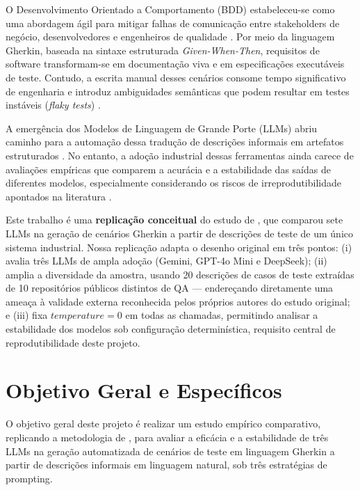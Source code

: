 \documentclass[12pt]{article}
\begin{document}
O Desenvolvimento Orientado a Comportamento (BDD) estabeleceu-se como uma abordagem ágil para mitigar falhas de comunicação entre stakeholders de negócio, desenvolvedores e engenheiros de qualidade \cite{solis2011,farooq2023}. Por meio da linguagem Gherkin, baseada na sintaxe estruturada \textit{Given-When-Then}, requisitos de software transformam-se em documentação viva e em especificações executáveis de teste. Contudo, a escrita manual desses cenários consome tempo significativo de engenharia e introduz ambiguidades semânticas que podem resultar em testes instáveis (\textit{flaky tests}) \cite{farooq2023}.

A emergência dos Modelos de Linguagem de Grande Porte (LLMs) abriu caminho para a automação dessa tradução de descrições informais em artefatos estruturados \cite{karpurapu2024}. No entanto, a adoção industrial dessas ferramentas ainda carece de avaliações empíricas que comparem a acurácia e a estabilidade das saídas de diferentes modelos, especialmente considerando os riscos de irreprodutibilidade apontados na literatura \cite{sallou2024}.

Este trabalho é uma \textbf{replicação conceitual} do estudo de \cite{fernandes2025}, que comparou sete LLMs na geração de cenários Gherkin a partir de descrições de teste de um único sistema industrial. Nossa replicação adapta o desenho original em três pontos: (i) avalia três LLMs de ampla adoção (Gemini, GPT-4o Mini e DeepSeek); (ii) amplia a diversidade da amostra, usando 20 descrições de casos de teste extraídas de 10 repositórios públicos distintos de QA --- endereçando diretamente uma ameaça à validade externa reconhecida pelos próprios autores do estudo original; e (iii) fixa $temperature=0$ em todas as chamadas, permitindo analisar a estabilidade dos modelos sob configuração determinística, requisito central de reprodutibilidade deste projeto.

\section{Objetivo Geral e Específicos}

O objetivo geral deste projeto é realizar um estudo empírico comparativo, replicando a metodologia de \cite{fernandes2025}, para avaliar a eficácia e a estabilidade de três LLMs na geração automatizada de cenários de teste em linguagem Gherkin a partir de descrições informais em linguagem natural, sob três estratégias de prompting.
\end{document}
